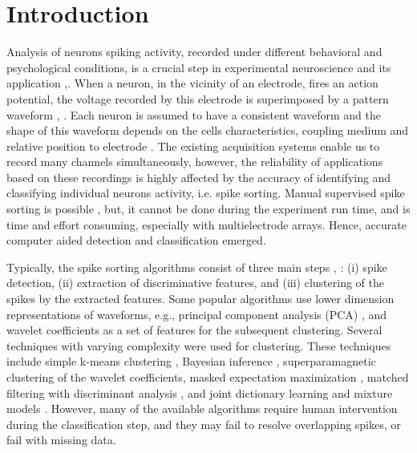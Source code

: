 \documentclass[conference]{IEEEtran}
\begin{document}
	\section{Introduction}
	Analysis of neurons spiking activity, recorded under different behavioral and psychological conditions, is a crucial step in experimental neuroscience and its application \cite{Nicolelis2009PrinciplesON},\cite{zador1997spikes}. When a neuron, in the vicinity of an electrode, fires an action potential, the voltage recorded by this electrode is superimposed by a pattern waveform \cite{wehr1999simultaneous}, \cite{lewicki1998review}. Each neuron is assumed to have a consistent waveform and the shape of this waveform depends on the cells characteristics, coupling medium and relative position to electrode \cite{lewicki1998review}. The existing acquisition systems enable us to record many channels simultaneously, however, the reliability of applications based on these recordings is highly affected by the accuracy of identifying and classifying individual neurons activity, i.e. spike sorting. Manual supervised spike sorting is possible \cite{rodieck1967maintained}, but, it cannot be done during the experiment run time, and is time and effort consuming, especially with multielectrode arrays. Hence, accurate computer aided detection and classification emerged.
	
	Typically, the spike sorting algorithms consist of three main steps \cite{wehr1999simultaneous}, \cite{lewicki1998review}: (i) spike detection, (ii) extraction of discriminative features, and (iii) clustering of the spikes by the extracted features. Some popular algorithms use lower dimension representations of waveforms, e.g., principal component analysis (PCA) \cite{lewicki1998review}, \cite{adamos2008performance} and wavelet coefficients \cite{quiroga2004unsupervised} as a set of features for the subsequent clustering. Several techniques with varying complexity were used for clustering. These techniques include simple k-means clustering \cite{lewicki1998review}, Bayesian inference \cite{wood2008nonparametric}, superparamagnetic clustering of the wavelet coefficients\cite{quiroga2004unsupervised}, masked expectation maximization \cite{kadir2014high}, matched filtering with discriminant analysis \cite{franke2015bayes}, and joint dictionary learning and mixture models \cite{carlson2013multichannel}. However, many of the available algorithms require human intervention during the classification step, and they may fail to resolve overlapping spikes, or fail with missing data.
	
\end{document}

